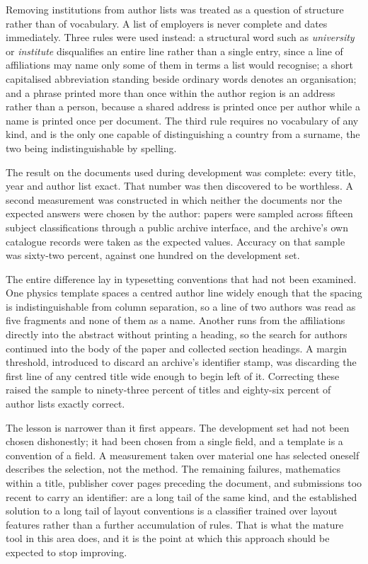 \documentclass[11pt,a4paper]{article}
\begin{document}
Removing institutions from author lists was treated as a question of structure
rather than of vocabulary. A list of employers is never complete and dates
immediately. Three rules were used instead: a structural word such as
\emph{university} or \emph{institute} disqualifies an entire line rather than a
single entry, since a line of affiliations may name only some of them in terms a
list would recognise; a short capitalised abbreviation standing beside ordinary
words denotes an organisation; and a phrase printed more than once within the
author region is an address rather than a person, because a shared address is
printed once per author while a name is printed once per document. The third rule
requires no vocabulary of any kind, and is the only one capable of distinguishing
a country from a surname, the two being indistinguishable by spelling.

The result on the documents used during development was complete: every title,
year and author list exact. That number was then discovered to be worthless. A
second measurement was constructed in which neither the documents nor the
expected answers were chosen by the author: papers were sampled across fifteen
subject classifications through a public archive interface, and the archive's own
catalogue records were taken as the expected values. Accuracy on that sample was
sixty-two percent, against one hundred on the development set.

The entire difference lay in typesetting conventions that had not been examined.
One physics template spaces a centred author line widely enough that the spacing
is indistinguishable from column separation, so a line of two authors was read as
five fragments and none of them as a name. Another runs from the affiliations
directly into the abstract without printing a heading, so the search for authors
continued into the body of the paper and collected section headings. A margin
threshold, introduced to discard an archive's identifier stamp, was discarding
the first line of any centred title wide enough to begin left of it. Correcting
these raised the sample to ninety-three percent of titles and eighty-six percent
of author lists exactly correct.

The lesson is narrower than it first appears. The development set had not been
chosen dishonestly; it had been chosen from a single field, and a template is a
convention of a field. A measurement taken over material one has selected
oneself describes the selection, not the method. The remaining failures,
mathematics within a title, publisher cover pages preceding the document, and
submissions too recent to carry an identifier: are a long tail of the same
kind, and the established solution to a long tail of layout conventions is a
classifier trained over layout features rather than a further accumulation of
rules. That is what the mature tool in this area does, and it is the point at
which this approach should be expected to stop improving.
\end{document}
